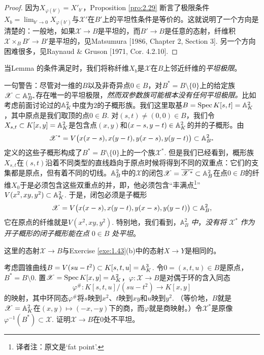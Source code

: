 \begin{proof}
因为$X_{\varphi(b')}=X'_{b'}$，Proposition \ref{pro:2.29} 断言了极限条件$X_b=\lim_{b'\to 0}X_{\varphi(b')}$与$\mathscr{X}'$在$B'$上的平坦性条件是等价的。这就说明了一个方向是清楚的：一般地，如果$\mathscr{X}\to B$是平坦的，而$B'\to B$是任意的态射，纤维积$\mathscr{X}\times_B B'\to B'$是平坦的，见Matsumura [1986, Chapter 2, Section 3]. 另一个方向困难很多，见Raynaud \& Gruson [1971, Cor. 4.2.10].
\end{proof}

当Lemma \thethm 的条件满足时，我们将称纤维$X_b$是$\mathscr{X}$在$B$上邻近纤维的\textit{平坦极限}。

一句警告：尽管对一维的$B$以及非奇异点$0\in B$，对$B^*=B\setminus \{0\}$上的给定族$\mathscr{X}\subset \mathbb{A}_{B^*}^n$存在唯一的平坦极限，\textit{然而双参数族可能根本没有任何平坦极限。}比如考虑前面讨论过的$\mathbb{A}_K^2$中度为$2$的子概形族。我们这里取基$B=\operatorname{Spec} K[s,t]=\mathbb{A}_{K}^2$，其中原点是我们取顶的点$0\in B$. 对$(s,t)\neq (0,0)\in B$，我们令$X_{s,t}\subset K[x,y]=\mathbb{A}_K^2$是包含点$(x,y)$和$(x-s,y-t)\in \mathbb{A}_K^2$的并的子概形。由
\[
	\mathscr{X}^*=V\bigl(x(x-s),x(y-t),y(x-s),y(y-t)\bigr)\subset \mathbb{A}_{B^*}^2
\]
定义的这些子概形构成了$B^*=B\setminus \{0\}$上的一个族$\mathscr{X}^*$. 但是我们已经看到，概形族$X_{s,t}$在$(s,t)$沿着不同类型的直线趋向于原点时候将得到不同的双重点：它们的支集都是原点，但有着不同的切线。$\mathbb{A}_B^2$中的$\mathscr{X}$的闭包$\mathscr{X}=\overline{\mathscr{X}^*}\subset \mathbb{A}_B^2$在点$0\in B$的纤维$X_0$于是必须包含这些双重点的并，即，他必须包含“丰满点\footnote{译者注：原文是`fat point'.}”$V(x^2,xy,y^2)\subset \mathbb{A}_K^2$. 于是，闭包必须是子概形
\[
	\mathscr{X}=V\bigl(x(x-s),x(y-t),y(x-s),y(y-t)\bigr)\subset \mathbb{A}_{B}^2,
\]
它在原点的纤维就是$V(x^2,xy,y^2)$. 特别地，我们看到，$\mathbb{A}_B^2$ \textit{中}，\textit{没有将} $\mathscr{X}^*$ {\large\it 作为开子概形的闭子概形能在点} $0\in B$ \textit{处平坦}。

这里的态射$\mathscr{X}\to B$与Exercise \ref{exe:1.43}(b)中的态射$X\to Y$是相同的。

\begin{exe}
考虑圆锥曲线$B=V(su-t^2)\subset K[s,t,u]=\mathbb{A}_K^3$. 令$0=(s,t,u)\in B$是原点，$B^*=B\setminus {0}$. 置$\mathscr{X}=\operatorname{Spec} K[x,y]=\mathbb{A}_K^2$，$\varphi:\mathscr{X}\to B$是对偶于环的含入同态
\[
	\varphi^{\#}:K[s,t,u]/(su-t^2)\to K[x,y]
\]
的映射，其中环同态$\varphi^{\#}$将$s$映到$x^2$、$t$映到$xy$和$u$映到$y^2$. （等价地，$B$就是$\mathscr{X}=\mathbb{A}_K^2$在$(x,y)\mapsto (-x,-y)$下的商，而$\varphi$就是商映射。）令$\mathscr{X}^*$是原像$\varphi^{-1}(B^*)\subset \mathscr{X}$. 证明$\mathscr{X}\to B$在$0$处不平坦。
\end{exe}

